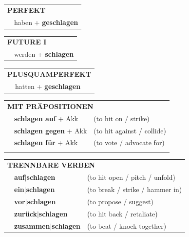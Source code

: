 \documentclass[10pt,a4paper]{revtex4-2}
\begin{document}
\begin{verbbox-acc}
 \begin{tabular}{rl}
     \multicolumn{2}{l}{\textbf{PERFEKT}}\\
   & haben + \textbf{geschlagen}\\
  \end{tabular}
\hfill
\begin{tabular}{rl}
    \multicolumn{2}{l}{\textbf{FUTURE I}}\\
   & werden + \textbf{schlagen}\\
  \end{tabular}
\hfill
\begin{tabular}{rl}
    \multicolumn{2}{l}{\textbf{PLUSQUAMPERFEKT}}\\
   & hatten + \textbf{geschlagen}\\
  \end{tabular}

 \vspace{10pt}

\begin{tabular}{lll}
      \multicolumn{3}{l}{\textbf{MIT PRÄPOSITIONEN}}\\
& \textbf{schlagen auf} + Akk & (to hit on / strike)\\
& \textbf{schlagen gegen} + Akk & (to hit against / collide)\\
& \textbf{schlagen für} + Akk & (to vote / advocate for)\\
\vspace{20pt}
\end{tabular}
  \hfill
\begin{tabular}{lll}
      \multicolumn{3}{l}{\textbf{TRENNBARE VERBEN}}\\
 & \textbf{auf$|$schlagen} & (to hit open / pitch / unfold)\\
 & \textbf{ein$|$schlagen} & (to break / strike / hammer in)\\
 & \textbf{vor$|$schlagen} & (to propose / suggest)\\
 & \textbf{zurück$|$schlagen} & (to hit back / retaliate)\\
 & \textbf{zusammen$|$schlagen} & (to beat / knock together)\\
  \end{tabular}

  \vspace{-5pt}

\end{verbbox-acc}
\end{document}
